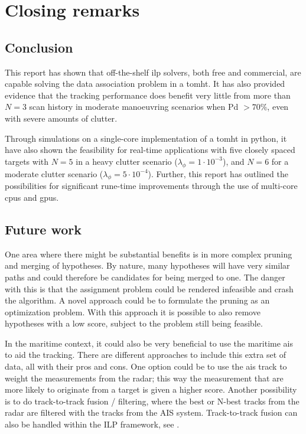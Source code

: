 \section{Closing remarks}
\subsection{Conclusion}
This report has shown that off-the-shelf \gls{ilp} \glspl{solver}, both free and commercial, are capable solving the data association problem in a \gls{tomht}. It has also provided evidence that the \gls{tracking} performance does benefit very little from more than $N=3$ scan history in moderate manoeuvring scenarios when \gls{Pd} $> 70\%$, even with severe amounts of \gls{clutter}.

Through simulations on a single-core implementation of a \gls{tomht} in \gls{python}, it have also shown the feasibility for real-time applications with five closely spaced targets with $N=5$ in a heavy clutter scenario ($\lambda_\phi = 1 \cdot 10^{-3}$), and $N=6$ for a moderate clutter scenario ($\lambda_\phi = 5 \cdot 10 ^{-4}$). Further, this report has  outlined the possibilities for significant rune-time improvements through the use of multi-core \glspl{cpu} and \glspl{gpu}.

\subsection{Future work}
One area where there might be substantial benefits is in more complex \gls{pruning} and merging of hypotheses. By nature, many hypotheses will have very similar paths and could therefore be candidates for being merged to one. The danger with this is that the assignment problem could be rendered infeasible and crash the algorithm. A novel approach could be to formulate the pruning as an optimization problem. With this approach it is possible to also remove hypotheses with a low score, subject to the problem still being feasible.

In the maritime context, it could also be very beneficial to use the maritime \gls{ais} to aid the \gls{tracking}. There are different approaches to include this extra set of data, all with their pros and cons. One option could be to use the \gls{ais} track to weight the measurements from the radar; this way the measurement that are more likely to originate from a target is given a higher score. Another possibility is to do track-to-track fusion / filtering, where the best or N-best tracks from the radar are filtered with the tracks from the AIS system. Track-to-track fusion can also be handled within the ILP framework, see \cite{Coraluppi2000}.

